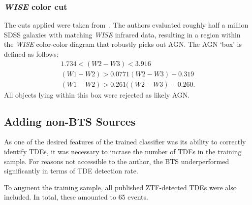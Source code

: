 \subsubsection{\textit{WISE} color cut}
The cuts applied were taken from~\cite{Hviding2022}. The authors evaluated roughly half a million SDSS galaxies with matching \textit{WISE} infrared data, resulting in a region within the \textit{WISE} color-color diagram that robustly picks out AGN. The AGN `box' is defined as follows:
\begin{subequations}
    \begin{eqnarray}
        1.734 < (\textit{W2}-\textit{W3}) < 3.916 \\
        (\textit{W1}-\textit{W2}) > 0.0771 (\textit{W2}-\textit{W3}) + 0.319 \\
        (\textit{W1}-\textit{W2}) > 0.261 ((\textit{W2}-\textit{W3}) - 0.260.
    \end{eqnarray}
\end{subequations}
All objects lying within this box were rejected as likely AGN.

\subsection{Adding non-BTS Sources}
As one of the desired features of the trained classifier was its ability to correctly identify TDEs, it was necessary to incrase the number of TDEs in the training sample. For reasons not accessible to the author, the BTS underperformed significantly in terms of TDE detection rate.

To augment the training sample, all published ZTF-detected TDEs were also included. In total, these amounted to 65 events.